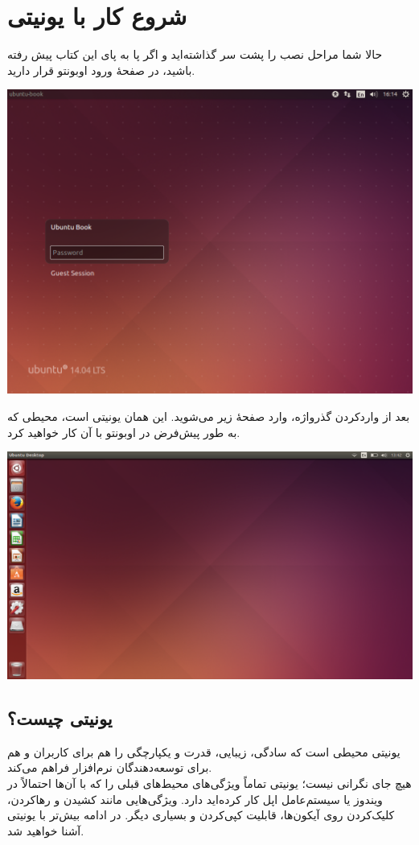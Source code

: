 \chapter{شروع کار با یونیتی}
حالا شما مراحل نصب را پشت سر گذاشته‌اید و اگر پا به پای این کتاب پیش رفته باشید، در صفحهٔ ورود اوبونتو قرار دارید.\\
\begin{center}
\includegraphics[scale=0.65]{pics/13.png}
\end{center}

بعد از واردکردن گذرواژه، وارد صفحهٔ زیر می‌شوید. این همان یونیتی است، محیطی که به طور پیش‌فرض در اوبونتو با آن کار خواهید کرد.
\begin{flushleft}
\includegraphics[scale=0.38]{pics/14.png}
\end{flushleft}

\section{یونیتی چیست؟}
یونیتی محیطی است که سادگی، زیبایی، قدرت و یکپارچگی را هم برای کاربران و هم برای توسعه‌دهندگان نرم‌افزار فراهم می‌کند.\\
هیچ جای نگرانی نیست؛ یونیتی تماماً ویژگی‌های محیط‌های قبلی را که با آن‌ها احتمالاً در ویندوز یا سیستم‌عامل اپل کار کرده‌اید دارد. ویژگی‌هایی مانند کشیدن و رهاکردن، کلیک‌کردن روی آیکون‌ها، قابلیت کپی‌کردن و بسیاری دیگر.
در ادامه بیش‌تر با یونیتی آشنا خواهید شد.
